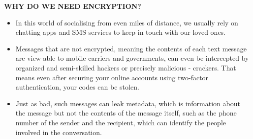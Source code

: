 \documentclass{beamer}
\begin{document}
\begin{frame}
\begin{tcolorbox}
\begin{center}
\textsc{\textbf{\textcolor{byzantium}{WHY DO WE NEED ENCRYPTION?}}}
\end{center}
\end{tcolorbox}
\begin{flushleft}
\begin{itemize}
\item In this world of socialising from even miles of distance, we usually rely on chatting apps and SMS services to keep in touch with our loved ones.
\item Messages that are not encrypted, meaning the contents of each text message are view-able to mobile carriers and governments, can even be intercepted by organized and semi-skilled hackers or precisely malicious - crackers. That means even after securing your online accounts using two-factor authentication, your codes can be stolen.
\item Just as bad, such messages can  leak metadata, which is information about the message but not the contents of the message itself, such as the phone number of the sender and the recipient, which can identify the people involved in the conversation. 
\end{itemize}
\end{flushleft}
\end{frame}
\end{document}
